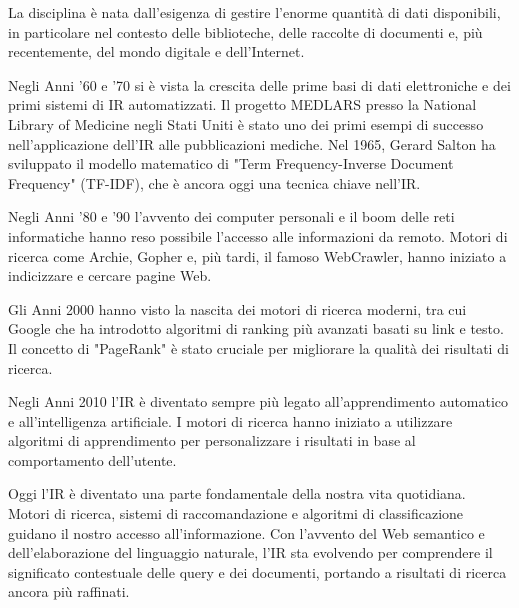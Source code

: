 La disciplina è nata dall'esigenza di gestire l'enorme quantità di dati disponibili, in particolare nel contesto delle biblioteche, delle raccolte di documenti e,
più recentemente, del mondo digitale e dell'Internet.

Negli Anni '60 e '70 si è vista la crescita delle prime basi di dati elettroniche e dei primi sistemi di IR automatizzati. Il progetto MEDLARS presso la National Library of Medicine negli Stati Uniti è stato uno dei primi esempi di successo nell'applicazione dell'IR alle pubblicazioni mediche. Nel 1965, Gerard Salton ha sviluppato il modello matematico di "Term Frequency-Inverse Document Frequency" (TF-IDF), che è ancora oggi una tecnica chiave nell'IR.

Negli Anni '80 e '90 l'avvento dei computer personali e il boom delle reti informatiche hanno reso possibile l'accesso alle informazioni da remoto. Motori di ricerca come Archie, Gopher e, più tardi, il famoso WebCrawler, hanno iniziato a indicizzare e cercare pagine Web.

Gli Anni 2000 hanno visto la nascita dei motori di ricerca moderni, tra cui Google che ha introdotto algoritmi di ranking più avanzati basati su link e testo. Il concetto di "PageRank" è stato cruciale per migliorare la qualità dei risultati di ricerca.

Negli Anni 2010 l'IR è diventato sempre più legato all'apprendimento automatico e all'intelligenza artificiale. I motori di ricerca hanno iniziato a utilizzare algoritmi di apprendimento per personalizzare i risultati in base al comportamento dell'utente.

Oggi l'IR è diventato una parte fondamentale della nostra vita quotidiana. Motori di ricerca, sistemi di raccomandazione e algoritmi di classificazione guidano il nostro accesso all'informazione. Con l'avvento del Web semantico e dell'elaborazione del linguaggio naturale, l'IR sta evolvendo per comprendere il significato contestuale delle query e dei documenti, portando a risultati di ricerca ancora più raffinati.


